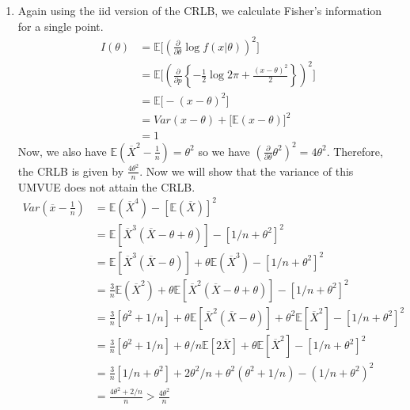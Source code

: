\documentclass[12pt]{article}  %
\newcommand{\E}{{\mathbb{E}}}
\begin{document}
\begin{enumerate}
\item Again using the iid version of the CRLB, we calculate Fisher's information for a single point. 
\begin{align*}
I(\theta) &= \E\Big[\left(\frac{\partial}{\partial\theta}\log f(x|\theta)\right)^2\Big]\\
&= \E\Big[\left(\frac{\partial}{\partial p}\left\{-\frac{1}{2}\log2\pi + \frac{(x-\theta)^2}{2}\right\}\right)^2\Big]\\
&= \E\Big[-(x-\theta)^2\Big]\\
&= Var(x-\theta) + \Big[\E(x - \theta)\Big]^2\\
&= 1 
\end{align*}
Now, we also have $\E(\overline{X}^2 - \frac{1}{n}) = \theta^2$ so we have $\left(\frac{\partial}{\partial \theta} \theta^2\right)^2 = 4\theta^2$. Therefore, the CRLB is given by $\frac{4\theta^2}{n}$. Now we will show that the variance of this UMVUE does not attain the CRLB. 
\begin{align*}
Var(\overline{x}-\frac{1}{n}) &= \E(\overline{X}^4) - [\E(\overline{X})]^2\\
&= \E[\overline{X}^3(\overline{X} - \theta + \theta)] - [1/n+\theta^2]^2\\
&= \E[\overline{X}^3(\overline{X} - \theta)] + \theta\E(\overline{X}^3) - [1/n+\theta^2]^2\\
&= \frac{3}{n}\E(\overline{X}^2) + \theta\E[\overline{X}^2(\overline{X} - \theta + \theta)]- [1/n+\theta^2]^2\\
&= \frac{3}{n}[\theta^2 + 1/n] + \theta\E[\overline{X}^2(\overline{X} - \theta)] + \theta^2\E[\overline{X}^2]- [1/n+\theta^2]^2\\
&= \frac{3}{n}[\theta^2 + 1/n] + \theta/n\E[2\overline{X}] + \theta\E[\overline{X}^2]- [1/n+\theta^2]^2\\
&= \frac{3}{n}[1/n + \theta^2] + 2\theta^2/n + \theta^2(\theta^2 + 1/n) - (1/n +\theta^2)^2\\
&= \frac{4\theta^2 + 2/n}{n} > \frac{4\theta^2}{n}
\end{align*}


\end{enumerate}
\end{document}
